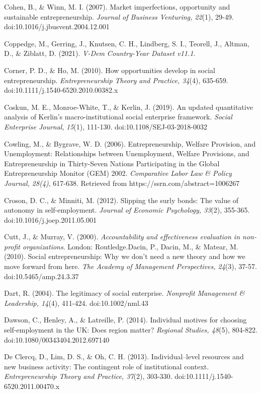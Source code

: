 \documentclass{article}
\begin{document}
Cohen, B., \& Winn, M. I. (2007). Market imperfections, opportunity and sustainable entrepreneurship. \emph{Journal of Business Venturing, 22}(1), 29-49. doi:10.1016/j.jbusvent.2004.12.001

Coppedge, M., Gerring, J., Knutsen, C. H., Lindberg, S. I., Teorell, J., Altman, D., \& Ziblatt, D. (2021). \emph{V-Dem Country-Year Dataset v11.1}. 

Corner, P. D., \& Ho, M. (2010). How opportunities develop in social entrepreneurship. \emph{Entrepreneurship Theory and Practice, 34}(4), 635-659. doi:10.1111/j.1540-6520.2010.00382.x

Coskun, M. E., Monroe-White, T., \& Kerlin, J. (2019). An updated quantitative analysis of Kerlin's macro-institutional social enterprise framework. \emph{Social Enterprise Journal}, \emph{15}(1), 111-130. doi:10.1108/SEJ-03-2018-0032

Cowling, M., \& Bygrave, W. D. (2006). Entrepreneurship, Welfare Provision, and Unemployment: Relationships between Unemployment, Welfare Provisions, and Entrepreneurship in Thirty-Seven Nations Participating in the Global Entrepreneurship Monitor (GEM) 2002. \emph{Comparative }\emph{Labor}\emph{ Law \& Policy Journal, 28(4)}, 617-638. Retrieved from https://ssrn.com/abstract=1006267

Croson, D. C., \& Minniti, M. (2012). Slipping the surly bonds: The value of autonomy in self-employment. \emph{Journal of Economic Psychology, 33}(2), 355-365. doi:10.1016/j.joep.2011.05.001

Cutt, J., \& Murray, V. (2000). \emph{Accountability and effectiveness evaluation in non-profit organizations}. London: Routledge.Dacin, P., Dacin, M., \& Matear, M. (2010). Social entrepreneurship: Why we don't need a new theory and how we move forward from here. \emph{The Academy of Management Perspectives, 24}(3), 37-57. doi:10.5465/amp.24.3.37

Dart, R. (2004). The legitimacy of social enterprise. \emph{Nonprofit}\emph{ Management \& Leadership, 14}(4), 411-424. doi:10.1002/nml.43

Dawson, C., Henley, A., \& Latreille, P. (2014). Individual motives for choosing self-employment in the UK: Does region matter? \emph{Regional Studies, 48}(5), 804-822. doi:10.1080/00343404.2012.697140

De Clercq, D., Lim, D. S., \& Oh, C. H. (2013). Individual--level resources and new business activity: The contingent role of institutional context. \emph{Entrepreneurship Theory and Practice, 37}(2), 303-330. doi:10.1111/j.1540-6520.2011.00470.x
\end{document}
